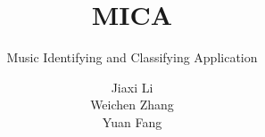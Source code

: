 \documentclass[whitelogo,12pt]{tudelft-report}
\begin{document}
\captionsetup{justification=centering}
\frontmatter

 \title[black]{MICA}
 \subtitle[tudelft-cyan]{Music Identifying and Classifying Application}
 \author[tudelft-white]{Jiaxi Li\\Weichen Zhang\\Yuan Fang}
 \titleoffsetx{10cm}
 \titleoffsety{10cm}
 \afiloffsetx{1cm}
 \afiloffsety{18cm}
\let\cleardoublepage\clearpage



\end{document}

